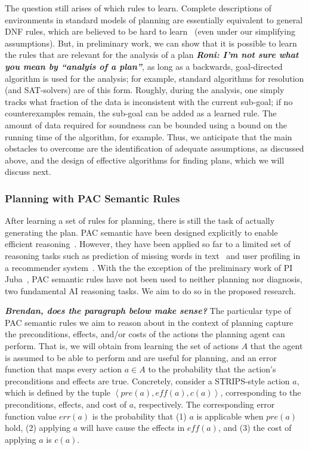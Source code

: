\documentclass[12pt]{article}
\newcommand{\note}[1]{\textbf{\textit{#1}}}
\newcommand{\tuple}[1]{\ensuremath{\left \langle #1 \right \rangle }}
\newcommand{\eff}{\textit{eff}}
\newcommand{\pre}{\textit{pre}}
\begin{document}
The question still arises of which rules to learn. Complete descriptions of environments in standard models of planning are essentially equivalent to general DNF rules, which are believed to be hard to learn~\cite{daniely2016dnf} (even under our simplifying assumptions). But, in preliminary work, we can show that it is possible to learn the rules that are relevant for the analysis of a plan \note{Roni: I'm not sure what you mean by ``analyis of a plan''}, as long as a backwards, goal-directed algorithm is used for the analysis; for example, standard algorithms for resolution (and SAT-solvers) are of this form. Roughly, during the analysis, one simply tracks what fraction of the data is inconsistent with the current sub-goal; if no counterexamples remain, the sub-goal can be added as a learned rule. The amount of data required for soundness can be bounded using a bound on the running time of the algorithm, for example. Thus, we anticipate that the main obstacles to overcome are the identification of adequate assumptions, as discussed above, and the design of effective algorithms for finding plans, which we will discuss next.

\subsubsection{Planning with PAC Semantic Rules}


After learning a set of rules for planning, there is still the task of actually generating the plan. PAC semantic have been designed explicitly to enable efficient reasoning~\cite{valiant2000robustLogics}. However, they have been applied so far to a limited set of reasoning tasks such as prediction of missing words in text~\cite{michael2008first} and user profiling in a recommender system~\cite{semeraro2009knowledge}. With the the exception of the preliminary work of PI Juba~\cite{juba2016aaai,juba2016jmlr}, PAC semantic rules have not been used to neither planning nor diagnosis, two fundamental AI reasoning tasks. We aim to do so in the proposed research. 


\note{Brendan, does the paragraph below make sense?}
The particular type of PAC semantic rules we aim to reason about in the context of planning capture the preconditions, effects, and/or costs of the actions the planning agent can perform. 
That is, we will obtain from learning the set of actions $A$ that the agent is assumed to be able to perform and are useful for planning, 
and an error function that maps every action $a\in A$ 
to the probability that the action's preconditions and effects are true.
Concretely, consider a STRIPS-style action $a$, which is defined by the tuple $\tuple{\pre(a), \eff(a), c(a)}$, corresponding to the preconditions, effects, and cost of $a$, respectively. The corresponding error function value $err(a)$ is the probability that (1) $a$ is applicable when $\pre(a)$ hold, (2) applying $a$ will have cause the effects in $\eff(a)$, and (3) the cost of applying $a$ is $c(a)$. 
\end{document}
